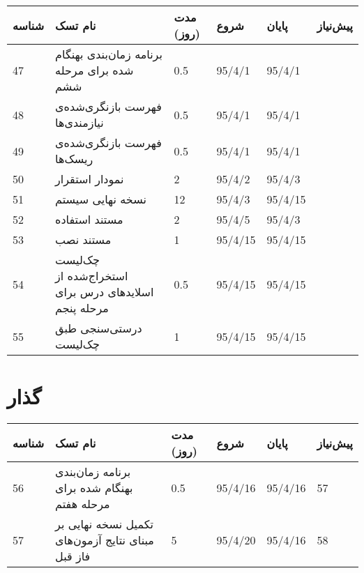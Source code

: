 \begin{tabular}[H]{ | l | l | l | l | l | l | }
	\hline
	شناسه & نام تسک & مدت (روز) & شروع & پایان & پیش‌نیاز    \\ \hline
	47 & برنامه زمان‌بندی بهنگام شده برای مرحله ششم & 0.5   &   95/4/1 &   95/4/1 &  \\ \hline
	48 &  فهرست بازنگری‌شده‌ی نیازمندی‌ها & 0.5   &   95/4/1 &   95/4/1 &  \\ \hline
	49 &  فهرست بازنگری‌شده‌ی ریسک‌ها & 0.5   &   95/4/1 &   95/4/1 &  \\ \hline
	50 & نمودار استقرار & 2   &   95/4/2 &   95/4/3 &      \\ \hline
	51 & نسخه نهایی سیستم & 12   &   95/4/3 &   95/4/15 &      \\ \hline
	52 & مستند استفاده & 2   &   95/4/5 &   95/4/3 &  \\ \hline
	53 & مستند نصب & 1   &   95/4/15 &   95/4/15 &  \\ \hline
	54 & چک‌لیست استخراج‌شده از اسلایدهای درس برای مرحله پنجم & 0.5   &   95/4/15 &   95/4/15 &  \\ \hline
	55 & درستی‌سنجی طبق  چک‌لیست  & 1   &   95/4/15 &   95/4/15 &  \\ \hline
\end{tabular}

\section{گذار}

\begin{tabular}[H]{ | l | l | l | l | l | l | }
	\hline
	شناسه & نام تسک & مدت (روز) & شروع & پایان & پیش‌نیاز    \\ \hline
	56 & برنامه زمان‌بندی بهنگام شده برای مرحله هفتم & 0.5   &   95/4/16 &   95/4/16 & 57    \\ \hline
	57 & تکمیل نسخه نهایی بر مبنای نتایج آزمون‌های فاز قبل & 5   &   95/4/20 &   95/4/16 & 58    \\ \hline
	
\end{tabular}
\restoregeometry